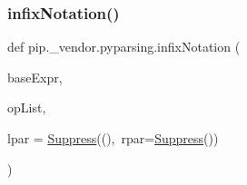 \subsubsection{\texorpdfstring{infix\+Notation()}{infixNotation()}}
{\footnotesize\ttfamily def pip.\+\_\+vendor.\+pyparsing.\+infix\+Notation (\begin{DoxyParamCaption}\item[{}]{base\+Expr,  }\item[{}]{op\+List,  }\item[{}]{lpar = {\ttfamily \hyperlink{classpip_1_1__vendor_1_1pyparsing_1_1Suppress}{Suppress}(\textquotesingle{}(\textquotesingle{}),~rpar=\hyperlink{classpip_1_1__vendor_1_1pyparsing_1_1Suppress}{Suppress}(\textquotesingle{})\textquotesingle{})} }\end{DoxyParamCaption})}

